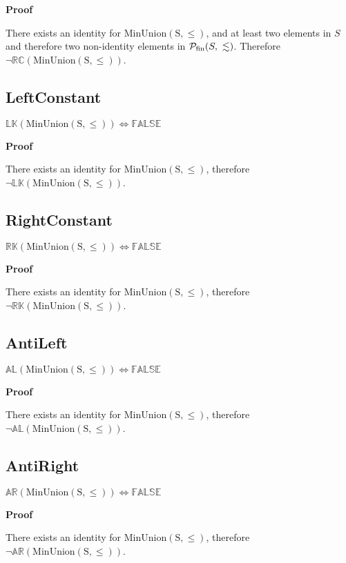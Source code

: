 \documentclass[10pt]{article}
\newcommand{\propname}[1]{{\mathbb{#1}}}
\newcommand{\proof}{\vspace{1em} \textbf{Proof} \vspace{1em}}
\begin{document}
\proof

There exists an identity for $\mathrm{MinUnion(S,\leq)}$, and at least two elements in $S$ and therefore two non-identity elements in ${\cal P}_{\mathrm{fin}}(S,\ \lesssim)$. Therefore $\neg \propname{RC}(\mathrm{MinUnion(S,\leq)})$.



\subsection{LeftConstant}
$\propname{LK}(\mathrm{MinUnion(S,\leq)}) \Leftrightarrow \propname{FALSE}$

\proof

There exists an identity for $\mathrm{MinUnion(S,\leq)}$, therefore $\neg \propname{LK}(\mathrm{MinUnion(S,\leq)})$.



\subsection{RightConstant}
$\propname{RK}(\mathrm{MinUnion(S,\leq)}) \Leftrightarrow \propname{FALSE}$

\proof

There exists an identity for $\mathrm{MinUnion(S,\leq)}$, therefore $\neg \propname{RK}(\mathrm{MinUnion(S,\leq)})$.



\subsection{AntiLeft}
$\propname{AL}(\mathrm{MinUnion(S,\leq)}) \Leftrightarrow \propname{FALSE}$

\proof

There exists an identity for $\mathrm{MinUnion(S,\leq)}$, therefore $\neg \propname{AL}(\mathrm{MinUnion(S,\leq)})$.


\subsection{AntiRight}
$\propname{AR}(\mathrm{MinUnion(S,\leq)}) \Leftrightarrow \propname{FALSE}$

\proof

There exists an identity for $\mathrm{MinUnion(S,\leq)}$, therefore $\neg \propname{AR}(\mathrm{MinUnion(S,\leq)})$.
\end{document}
